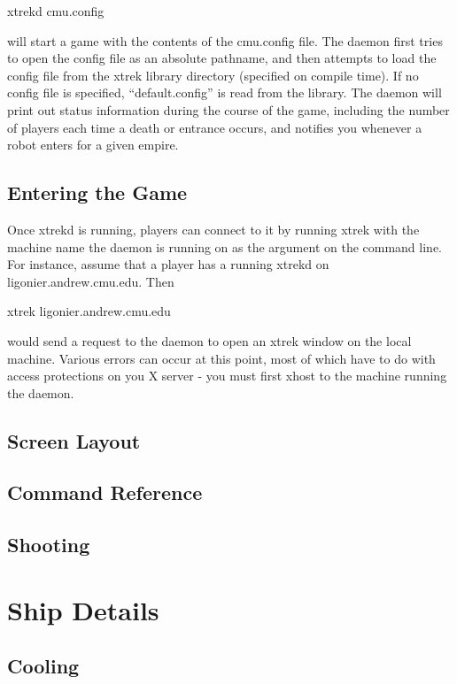 xtrekd cmu.config

will start a game with the contents of the cmu.config file. The daemon first tries to open the config file
as an absolute pathname, and then attempts to load the config file from the xtrek library directory (specified
on compile time). If no config file is specified, ``default.config'' is read from the library. The daemon will
print out status information during the course of the game, including the number of players each time a death
or entrance occurs, and notifies you whenever a robot enters for a given empire.

\subsection{Entering the Game}

Once xtrekd is running, players can connect to it by running xtrek with the machine name the daemon is running
on as the argument on the command line. For instance, assume that a player has a running xtrekd on ligonier.andrew.cmu.edu.
Then

xtrek ligonier.andrew.cmu.edu

would send a request to the daemon to open an xtrek window on the local machine. Various errors can occur at this point,
most of which have to do with access protections on you X server - you must first xhost to the machine running the
daemon.

\subsection{Screen Layout}

\subsection{Command Reference}

\subsection{Shooting}

\section{Ship Details}

\subsection{Cooling}

